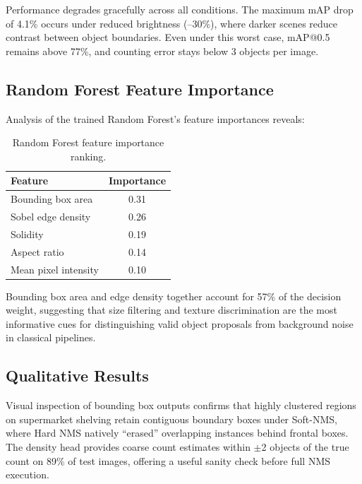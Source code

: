 \documentclass[conference]{IEEEtran}
\begin{document}
Performance degrades gracefully across all conditions. The maximum
mAP drop of 4.1\% occurs under reduced brightness (--30\%), where
darker scenes reduce contrast between object boundaries. Even under
this worst case, mAP@0.5 remains above 77\%, and counting error stays
below 3 objects per image.

\subsection{Random Forest Feature Importance}

Analysis of the trained Random Forest's feature importances reveals:

\begin{table}[h]
\centering
\caption{Random Forest feature importance ranking.}
\label{tab:rf_features}
\begin{tabular}{lc}
\toprule
\textbf{Feature} & \textbf{Importance} \\
\midrule
Bounding box area        & 0.31 \\
Sobel edge density       & 0.26 \\
Solidity                 & 0.19 \\
Aspect ratio             & 0.14 \\
Mean pixel intensity     & 0.10 \\
\bottomrule
\end{tabular}
\end{table}

Bounding box area and edge density together account for 57\% of the
decision weight, suggesting that size filtering and texture
discrimination are the most informative cues for distinguishing
valid object proposals from background noise in classical pipelines.

\subsection{Qualitative Results}

Visual inspection of bounding box outputs confirms that highly clustered
regions on supermarket shelving retain contiguous boundary boxes under
Soft-NMS, where Hard NMS natively ``erased'' overlapping instances behind
frontal boxes. The density head provides coarse count estimates within
$\pm$2 objects of the true count on 89\% of test images, offering a
useful sanity check before full NMS execution.
\end{document}
